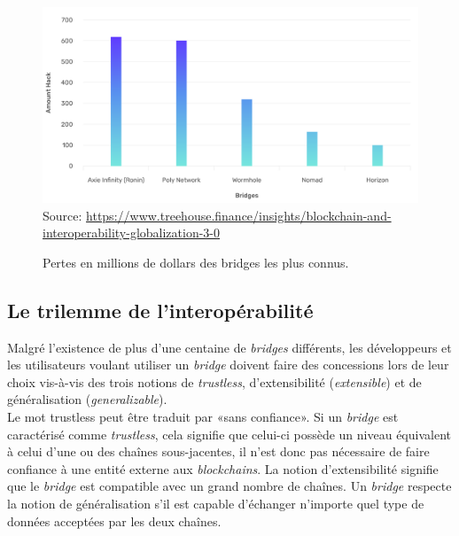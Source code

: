 \begin{figure}[h!]
    \centering
\includegraphics[scale=0.50]{centralisation/imagesBridges/GraphLossesBridges.png}
    {\scriptsize
            Source: \url{https://www.treehouse.finance/insights/blockchain-and-interoperability-globalization-3-0}}
    \caption{Pertes en millions de dollars des bridges les plus connus.}
    \label{fig:GraphBridges}
\end{figure}


\subsection{Le trilemme de l’interopérabilité}

Malgré l’existence de plus d’une centaine de \textit{bridges} différents, les développeurs et les utilisateurs voulant utiliser un \textit{bridge} doivent faire des concessions lors de leur choix vis-à-vis des trois notions de \textit{trustless}, d’extensibilité (\textit{extensible}) et de généralisation (\textit{generalizable}).\\

Le mot trustless peut être traduit par «sans confiance». Si un \textit{bridge} est caractérisé comme \textit{trustless}, cela signifie que celui-ci possède un niveau équivalent à celui d’une ou des chaînes sous-jacentes, il n'est donc pas nécessaire de faire confiance à une entité externe aux \textit{blockchains}.  La notion  d’extensibilité signifie que le \textit{bridge} est compatible avec un grand nombre de chaînes.
Un \textit{bridge} respecte la notion de généralisation s’il est capable d'échanger n’importe quel type de données acceptées par les deux chaînes.\\

